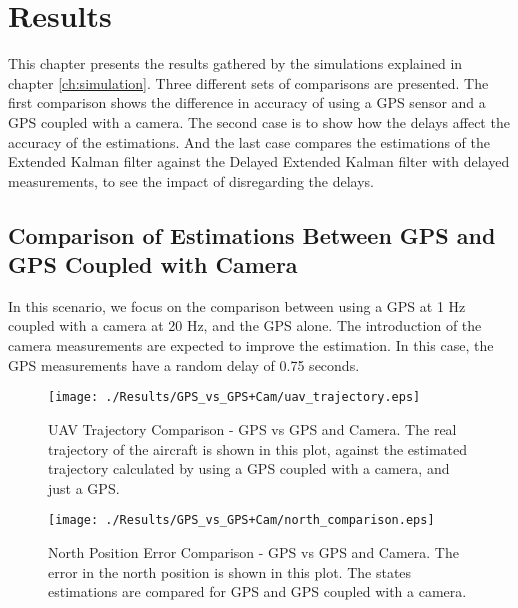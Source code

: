 \chapter{Results}
\label{ch:results}

This chapter presents the results gathered by the simulations explained in chapter \ref{ch:simulation}. Three different sets of comparisons are presented. The first comparison shows the difference in accuracy of using a GPS sensor and a GPS coupled with a camera. The second case is to show how the delays affect the accuracy of the estimations. And the last case compares the estimations of the Extended Kalman filter against the Delayed Extended Kalman filter with delayed measurements, to see the impact of disregarding the delays.

\section{Comparison of Estimations Between GPS and GPS Coupled with Camera}
In this scenario, we focus on the comparison between using a GPS at 1 Hz coupled with a camera at 20 Hz, and the GPS alone. The introduction of the camera measurements are expected to improve the estimation. In this case, the GPS measurements have a random delay of 0.75 seconds.
\begin{figure}[H]
  \centering
  \texttt{[image: ./Results/GPS\_vs\_GPS+Cam/uav\_trajectory.eps]}
  \caption[UAV Trajectory Comparison - GPS vs GPS and Camera]{UAV Trajectory Comparison - GPS vs GPS and Camera. The real trajectory of the aircraft is shown in this plot, against the estimated trajectory calculated by using a GPS coupled with a camera, and just a GPS.}
\end{figure}

\begin{figure}[H]
  \centering
  \texttt{[image: ./Results/GPS\_vs\_GPS+Cam/north\_comparison.eps]}
  \caption[North Position Error Comparison - GPS vs GPS and Camera]{North Position Error Comparison - GPS vs GPS and Camera. The error in the north position is shown in this plot. The states estimations are compared for GPS and GPS coupled with a camera.}
\end{figure}

